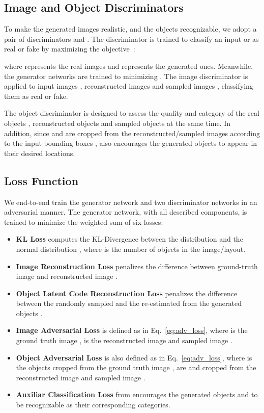 \documentclass[10pt,twocolumn,letterpaper]{article}
\begin{document}
\subsection{Image and Object Discriminators}
To make the generated images realistic, and the objects recognizable, we adopt a pair of discriminators  and .
The discriminator is trained to classify an input  or  as real or fake by maximizing the objective~\cite{Goodfellow2014}:

where  represents the real images and  represents the generated ones.
Meanwhile, the generator networks are trained to minimizing .
The image discriminator  is applied to input images , reconstructed images  and sampled images , classifying them as real or fake.


The object discriminator  is designed to assess the quality and category of the real objects , reconstructed objects  and sampled objects  at the same time.
In addition, since  and  are cropped from the reconstructed/sampled images according to the input bounding boxes ,  also encourages the generated objects to appear in their desired locations. 





\subsection{Loss Function}
We end-to-end train the generator network and two discriminator networks in an adversarial manner. The generator network, with all described components, is trained to minimize the weighted sum of six losses:

\begin{itemize}[leftmargin=*]
\setlength{\itemsep}{0pt}
  \item \textbf{KL Loss}  computes the KL-Divergence between the distribution  and the normal distribution , where  is the number of objects in the image/layout. 
  \item \textbf{Image Reconstruction Loss}  penalizes the  difference between ground-truth image  and reconstructed image . 
  \item \textbf{Object Latent Code Reconstruction Loss}  penalizes the  difference between the randomly sampled  and the re-estimated  from the generated objects .
  \item \textbf{Image Adversarial Loss}  is defined as in Eq.~\eqref{eq:adv_loss}, where  is the ground truth image ,  is the reconstructed image  and sampled image .
  \item \textbf{Object Adversarial Loss}  is also defined as in Eq.~\eqref{eq:adv_loss}, where  is the objects  cropped from the ground truth image ,  are  and  cropped from the reconstructed image  and sampled image .
  \item \textbf{Auxiliar Classification Loss}  from  encourages the generated objects  and  to be recognizable as their corresponding categories.
\end{itemize}
\end{document}
